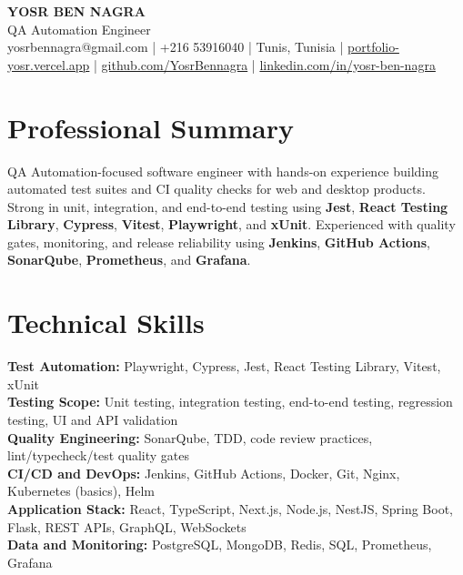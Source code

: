 \documentclass[10pt,a4paper]{article}
\begin{document}
\begin{center}
  {\Large\bfseries YOSR BEN NAGRA}\\[2pt]
  {\small QA Automation Engineer}\\[3pt]
  {\footnotesize yosrbennagra@gmail.com \;|\; +216 53916040 \;|\; Tunis, Tunisia \;|\; \href{https://portfolio-yosr.vercel.app/en}{portfolio-yosr.vercel.app} \;|\; \href{https://github.com/YosrBennagra}{github.com/YosrBennagra} \;|\; \href{https://www.linkedin.com/in/yosr-ben-nagra/}{linkedin.com/in/yosr-ben-nagra}}
\end{center}

\section*{Professional Summary}
{\small
QA Automation-focused software engineer with hands-on experience building automated test suites and CI quality checks for web and desktop products. Strong in unit, integration, and end-to-end testing using \textbf{Jest}, \textbf{React Testing Library}, \textbf{Cypress}, \textbf{Vitest}, \textbf{Playwright}, and \textbf{xUnit}. Experienced with quality gates, monitoring, and release reliability using \textbf{Jenkins}, \textbf{GitHub Actions}, \textbf{SonarQube}, \textbf{Prometheus}, and \textbf{Grafana}.
}

\vspace{2pt}

\section*{Technical Skills}
{\small
\textbf{Test Automation:} Playwright, Cypress, Jest, React Testing Library, Vitest, xUnit\\[2pt]
\textbf{Testing Scope:} Unit testing, integration testing, end-to-end testing, regression testing, UI and API validation\\[2pt]
\textbf{Quality Engineering:} SonarQube, TDD, code review practices, lint/typecheck/test quality gates\\[2pt]
\textbf{CI/CD and DevOps:} Jenkins, GitHub Actions, Docker, Git, Nginx, Kubernetes (basics), Helm\\[2pt]
\textbf{Application Stack:} React, TypeScript, Next.js, Node.js, NestJS, Spring Boot, Flask, REST APIs, GraphQL, WebSockets\\[2pt]
\textbf{Data and Monitoring:} PostgreSQL, MongoDB, Redis, SQL, Prometheus, Grafana
}
\end{document}
